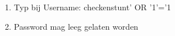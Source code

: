 \begin{enumerate}
  \item Typ bij Username: checkenstunt' OR '1'='1
  \item Password mag leeg gelaten worden
\end{enumerate}